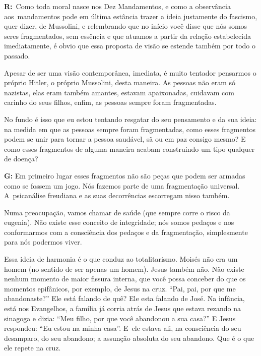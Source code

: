  

\textbf{R:}~Como toda moral nasce nos Dez Mandamentos, e como a
observância aos\textbf{}~mandamentos pode em última estância trazer a
ideia justamente do fascismo, quer dizer, de Mussolini, e relembrando
que no início você disse que nós somos seres fragmentados, sem essência
e que atuamos a partir da relação estabelecida imediatamente, é obvio
que essa proposta de visão se estende também por todo o passado.

 

Apesar de ser uma visão contemporânea, imediata, é muito tentador
pensarmos o próprio Hitler, o próprio Mussolini, desta maneira. As
pessoas não eram só nazistas, elas eram também amantes, estavam
apaixonadas, cuidavam com carinho do seus filhos, enfim, as pessoas
sempre foram fragmentadas.

 

No fundo é isso que eu estou tentando resgatar do seu pensamento e da
sua ideia: na medida em que as pessoas sempre foram fragmentadas, como
esses fragmentos podem se unir para tornar a pessoa saudável, sã ou em
paz consigo mesmo? E como esses fragmentos de alguma maneira acabam
construindo um tipo qualquer de doença?

 

\textbf{G:} Em primeiro lugar esses fragmentos não são peças que podem
ser armadas como se fossem um jogo. Nós fazemos parte de uma
fragmentação universal. A~psicanálise freudiana e as suas decorrências
escorregam nisso também.

 

Numa preocupação, vamos chamar de saúde (que sempre corre o risco da
eugenia). Não existe esse conceito de integridade; nós somos pedaços e
nos conformarmos com a consciência dos pedaços e da fragmentação,
simplesmente para nós podermos viver.

 

Essa ideia de harmonia é o que conduz ao totalitarismo. Moisés não era um
homem (no sentido de ser apenas um homem). Jesus também não. Não existe
nenhum momento de maior fissura interna, que você possa conceber do que
os momentos epifânicos, por exemplo, de Jesus na cruz. ``Pai, pai, por
que me abandonaste?'' Ele está falando de quê? Ele esta falando de José.
Na infância, está nos Evangelhos, a família já corria atrás de Jesus que
estava rezando na sinagoga e dizia: ``Meu filho, por que você abandonou
a sua casa?'' E Jesus respondeu: ``Eu estou na minha casa''. E~ele
estava ali, na consciência do seu desamparo, do seu abandono; a assunção
absoluta do seu abandono. Que é o que ele repete na cruz.

